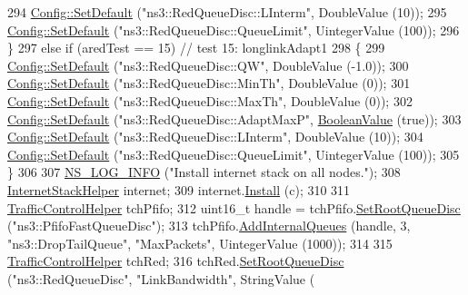 \begin{DoxyCode}
294       \hyperlink{group__config_ga2e7882df849d8ba4aaad31c934c40c06}{Config::SetDefault} (\textcolor{stringliteral}{"ns3::RedQueueDisc::LInterm"}, DoubleValue (10));
295       \hyperlink{group__config_ga2e7882df849d8ba4aaad31c934c40c06}{Config::SetDefault} (\textcolor{stringliteral}{"ns3::RedQueueDisc::QueueLimit"}, UintegerValue (100));
296     \}
297   \textcolor{keywordflow}{else} \textcolor{keywordflow}{if} (aredTest == 15) \textcolor{comment}{// test 15: longlinkAdapt1}
298     \{
299       \hyperlink{group__config_ga2e7882df849d8ba4aaad31c934c40c06}{Config::SetDefault} (\textcolor{stringliteral}{"ns3::RedQueueDisc::QW"}, DoubleValue (-1.0));
300       \hyperlink{group__config_ga2e7882df849d8ba4aaad31c934c40c06}{Config::SetDefault} (\textcolor{stringliteral}{"ns3::RedQueueDisc::MinTh"}, DoubleValue (0));
301       \hyperlink{group__config_ga2e7882df849d8ba4aaad31c934c40c06}{Config::SetDefault} (\textcolor{stringliteral}{"ns3::RedQueueDisc::MaxTh"}, DoubleValue (0));
302       \hyperlink{group__config_ga2e7882df849d8ba4aaad31c934c40c06}{Config::SetDefault} (\textcolor{stringliteral}{"ns3::RedQueueDisc::AdaptMaxP"}, 
      \hyperlink{classns3_1_1BooleanValue}{BooleanValue} (\textcolor{keyword}{true}));
303       \hyperlink{group__config_ga2e7882df849d8ba4aaad31c934c40c06}{Config::SetDefault} (\textcolor{stringliteral}{"ns3::RedQueueDisc::LInterm"}, DoubleValue (10));
304       \hyperlink{group__config_ga2e7882df849d8ba4aaad31c934c40c06}{Config::SetDefault} (\textcolor{stringliteral}{"ns3::RedQueueDisc::QueueLimit"}, UintegerValue (100));
305     \}
306 
307   \hyperlink{group__logging_gafbd73ee2cf9f26b319f49086d8e860fb}{NS\_LOG\_INFO} (\textcolor{stringliteral}{"Install internet stack on all nodes."});
308   \hyperlink{classns3_1_1InternetStackHelper}{InternetStackHelper} internet;
309   internet.\hyperlink{classns3_1_1InternetStackHelper_a6645b412f31283d2d9bc3d8a95cebbc0}{Install} (c);
310 
311   \hyperlink{classns3_1_1TrafficControlHelper}{TrafficControlHelper} tchPfifo;
312   uint16\_t handle = tchPfifo.\hyperlink{classns3_1_1TrafficControlHelper_a8588aac7a08e4dc4e7bb10fa7b9e25c8}{SetRootQueueDisc} (\textcolor{stringliteral}{"ns3::PfifoFastQueueDisc"});
313   tchPfifo.\hyperlink{classns3_1_1TrafficControlHelper_aefc1be32222be2d9aa714367552c7179}{AddInternalQueues} (handle, 3, \textcolor{stringliteral}{"ns3::DropTailQueue"}, \textcolor{stringliteral}{"MaxPackets"}, UintegerValue
       (1000));
314 
315   \hyperlink{classns3_1_1TrafficControlHelper}{TrafficControlHelper} tchRed;
316   tchRed.\hyperlink{classns3_1_1TrafficControlHelper_a8588aac7a08e4dc4e7bb10fa7b9e25c8}{SetRootQueueDisc} (\textcolor{stringliteral}{"ns3::RedQueueDisc"}, \textcolor{stringliteral}{"LinkBandwidth"}, StringValue (

\end{DoxyCode}
